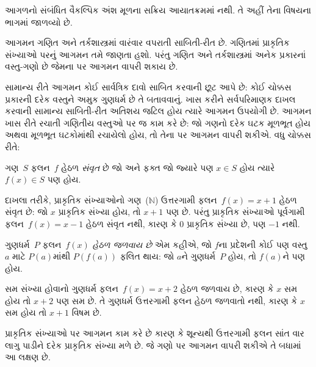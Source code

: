\OLEndPartHook

\begin{editorial}
આગળનો સંબંધિત વૈકલ્પિક અંશ મૂળના સક્રિય આયાતક્રમમાં નથી. તે અહીં તેના વિષયના ભાગમાં જાળવ્યો છે.
\end{editorial}
\begingroup
\makeatletter{}\makeatother


\label{guunit:OLP-0718}


\begin{explain}
આગમન ગણિત અને તર્કશાસ્ત્રમાં વારંવાર વપરાતી સાબિતી-રીત છે.
ગણિતમાં પ્રાકૃતિક સંખ્યાઓ પરનું આગમન તમે જાણતા હશો.
પરંતુ ગણિત અને તર્કશાસ્ત્રમાં અનેક પ્રકારનાં વસ્તુ-ગણો છે
જેમના પર આગમન વાપરી શકાય છે.

સામાન્ય રીતે આગમન કોઈ સાર્વત્રિક દાવો સાબિત કરવાની છૂટ આપે છે:
કોઈ ચોક્કસ પ્રકારની દરેક વસ્તુને અમુક ગુણધર્મ છે તે બતાવવાનું.
ખાસ કરીને સર્વપરિમાણક દાખલ કરવાની સામાન્ય સાબિતી-રીત
અતિશય જટિલ હોય ત્યારે આગમન ઉપયોગી છે.
આગમન ખાસ રીતે રચાતી ગણિતીય વસ્તુઓ પર જ કામ કરે છે:
જો ગણનો દરેક ઘટક મૂળભૂત હોય અથવા મૂળભૂત ઘટકોમાંથી
રચાયેલો હોય, તો તેના પર આગમન વાપરી શકીએ.
વધુ ચોક્કસ રીતે:
\end{explain}

\begin{defn}
ગણ~$S$ ફલન~$f$ હેઠળ \emph{સંવૃત} છે જો અને ફક્ત જો
જ્યારે પણ $x \in S$ હોય ત્યારે $f(x) \in S$ પણ હોય.
\end{defn}

\begin{explain}
દાખલા તરીકે, પ્રાકૃતિક સંખ્યાઓનો ગણ~($\mathbb{N}$)
ઉત્તરગામી ફલન~$f(x) = x+1$ હેઠળ સંવૃત છે:
જો $x$ પ્રાકૃતિક સંખ્યા હોય, તો $x+1$ પણ છે.
પરંતુ પ્રાકૃતિક સંખ્યાઓ પૂર્વગામી ફલન~$f(x) = x-1$
હેઠળ સંવૃત નથી, કારણ કે $0$ પ્રાકૃતિક સંખ્યા છે, પણ $-1$ નથી.
\end{explain}

\begin{defn}
ગુણધર્મ~$P$ ફલન~$f(x)$ \emph{હેઠળ જળવાય છે} એમ કહીએ,
જો $f$ના પ્રદેશની કોઈ પણ વસ્તુ~$a$ માટે
$P(a)$માંથી $P(f(a))$ ફલિત થાય:
જો $a$ને ગુણધર્મ~$P$ હોય, તો $f(a)$ને પણ હોય.
\end{defn}

\begin{explain}
સમ સંખ્યા હોવાનો ગુણધર્મ ફલન~$f(x) = x+2$ હેઠળ જળવાય છે,
કારણ કે $x$ સમ હોય તો $x+2$ પણ સમ છે.
તે ગુણધર્મ ઉત્તરગામી ફલન હેઠળ જળવાતો નથી,
કારણ કે $x$ સમ હોય તો $x+1$ વિષમ છે.

પ્રાકૃતિક સંખ્યાઓ પર આગમન કામ કરે છે કારણ કે શૂન્યથી
ઉત્તરગામી ફલન સાંત વાર લાગુ પાડીને દરેક પ્રાકૃતિક સંખ્યા મળે છે.
જે ગણો પર આગમન વાપરી શકીએ તે બધામાં આ લક્ષણ છે.
\end{explain}

